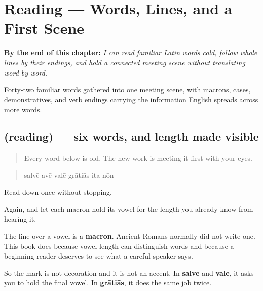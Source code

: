 
\chapter{Reading — Words, Lines, and a First Scene}
\label{ch:la-prima-lectio}

\begin{chapteropening}
\textbf{By the end of this chapter:} \emph{I can read familiar Latin words cold, follow whole lines by their endings, and hold a connected meeting scene without translating word by word.}

Forty-two familiar words gathered into one meeting scene, with macrons, cases, demonstratives, and verb endings carrying the information English spreads across more words.
\end{chapteropening}

\section[(reading)]{(reading) — six words, and length made visible}

\label{lesson:LA-C58-verba}



\begin{quote}
Every word below is old. The new work is meeting it first with your eyes.
\end{quote}

\begin{tcolorbox}[breakable,skin=enhanced,colback=orange!6,colframe=orange!45!black,boxrule=0.5pt,arc=1mm,left=6pt,right=6pt,top=4pt,bottom=4pt,fonttitle=\bfseries,title={Read this}]
\begin{quote}
salvē avē valē grātiās ita nōn
\end{quote}

Read down once without stopping.

Again, and let each macron hold its vowel for the length you already know from hearing it.
\end{tcolorbox}

\begin{grammarlens}[title={Grammar Lens: a mark Romans did not need}]
The line over a vowel is a \textbf{macron}. Ancient Romans normally did not write one. This book does because vowel length can distinguish words and because a beginning reader deserves to see what a careful speaker says.

So the mark is not decoration and it is not an accent. In \textbf{salvē} and \textbf{valē}, it asks you to hold the final vowel. In \textbf{grātiās}, it does the same job twice.
\end{grammarlens}

